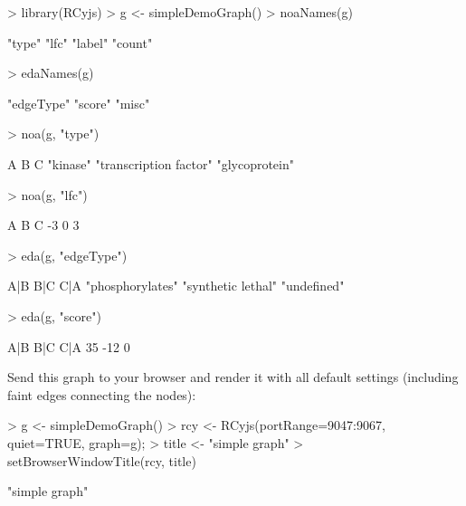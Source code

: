 \documentclass{article}
\begin{document}
\begin{Schunk}
\begin{Sinput}
> library(RCyjs)
> g <- simpleDemoGraph()
> noaNames(g)
\end{Sinput}
\begin{Soutput}
[1] "type"  "lfc"   "label" "count"
\end{Soutput}
\begin{Sinput}
> edaNames(g)
\end{Sinput}
\begin{Soutput}
[1] "edgeType" "score"    "misc"    
\end{Soutput}
\begin{Sinput}
> noa(g, "type")
\end{Sinput}
\begin{Soutput}
                     A                      B                      C 
              "kinase" "transcription factor"         "glycoprotein" 
\end{Soutput}
\begin{Sinput}
> noa(g, "lfc")
\end{Sinput}
\begin{Soutput}
 A  B  C 
-3  0  3 
\end{Soutput}
\begin{Sinput}
> eda(g, "edgeType")
\end{Sinput}
\begin{Soutput}
               A|B                B|C                C|A 
  "phosphorylates" "synthetic lethal"        "undefined" 
\end{Soutput}
\begin{Sinput}
> eda(g, "score")
\end{Sinput}
\begin{Soutput}
A|B B|C C|A 
 35 -12   0 
\end{Soutput}
\end{Schunk}

Send this graph to your browser and render it with all default settings (including faint edges connecting the nodes):
\begin{Schunk}
\begin{Sinput}
> g <- simpleDemoGraph()
> rcy <- RCyjs(portRange=9047:9067, quiet=TRUE, graph=g);
> title <- "simple graph"
> setBrowserWindowTitle(rcy, title)
\end{Sinput}
\begin{Soutput}
[1] "simple graph"
\end{Soutput}
\end{Schunk}
\end{document}
